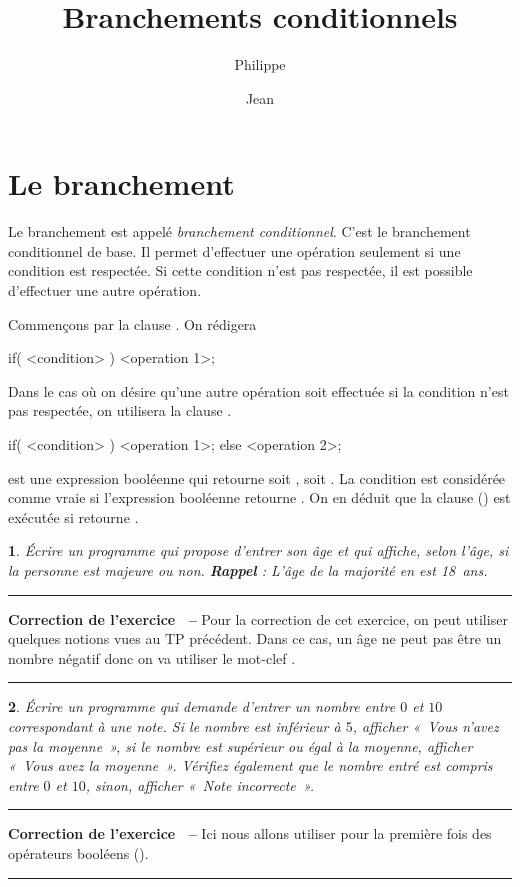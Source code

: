 \documentclass[a4paper]{article}
\title{Branchements conditionnels}
\author{Philippe \Nom{Rinaudo}\and{}Jean \Nom{Simard}}
\date{\Date[l]{08}{10}{2009}}
\newenvironment{Correction}{\par\tiny\blue\rule[1ex]{\textwidth}{1pt}\par\normalsize\textbf{\sffamily{}Correction de l'exercice~\theExo{} -- }}{\par\tiny\blue\rule[1ex]{\textwidth}{1pt}\par}
\newtheorem{Exo}{{\sffamily{Exercice}}}
\begin{document}
	\maketitle
	\section{Le branchement }
		Le branchement  est appelé \emph{branchement conditionnel}.
		C'est le branchement conditionnel de base.
		Il permet d'effectuer une opération seulement si une condition est respectée.
		Si cette condition n'est pas respectée, il est possible d'effectuer une autre opération.

		Commençons par la clause .
		On rédigera
		\begin{Code*}
if( <condition> )
{
	<operation 1>;
}
		\end{Code*}

		Dans le cas où on désire qu'une autre opération soit effectuée si la condition n'est pas respectée, on utilisera la clause .
		\begin{Code*}
if( <condition> )
{
	<operation 1>;
}
else
{
	<operation 2>;
}
		\end{Code*}

		 est une expression booléenne qui retourne soit , soit .
		La condition est considérée comme vraie si l'expression booléenne retourne .
		On en déduit que la clause  () est exécutée si  retourne .

		\begin{Exo}
			Écrire un programme qui propose d'entrer son âge et qui affiche, selon l'âge, si la personne est majeure ou non.
			\textbf{Rappel} : L'âge de la majorité en  est 18~ans.
		\end{Exo}
		\begin{Correction}
			Pour la correction de cet exercice, on peut utiliser quelques notions vues au TP précédent.
			Dans ce cas, un âge ne peut pas être un nombre négatif donc on va utiliser le mot-clef .
		\end{Correction}
		\begin{Exo}
			Écrire un programme qui demande d'entrer un nombre entre $0$ et $10$ correspondant à une note.
			Si le nombre est inférieur à $5$, afficher «~\emph{Vous n'avez pas la moyenne}~», si le nombre est supérieur ou égal à la moyenne, afficher «~\emph{Vous avez la moyenne}~».
			Vérifiez également que le nombre entré est compris entre $0$ et $10$, sinon, afficher «~\emph{Note incorrecte}~».
		\end{Exo}
		\begin{Correction}
			Ici nous allons utiliser pour la première fois des opérateurs booléens (\code{&&}).
		\end{Correction}
\end{document}
